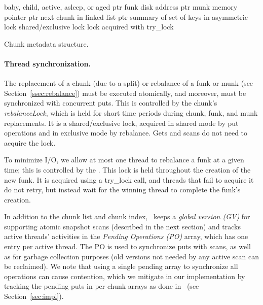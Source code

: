 \begin{algorithm}[htb]

\begin{algorithmic}
\State {} \Comment  baby, child, active, asleep, or aged
\State ptr  \Comment funk disk address
\State ptr  \Comment munk memory pointer
\State ptr  \Comment next chunk in linked list
\State ptr  \Comment summary of set of keys in 
\State asymmetric lock  \Comment shared/exclusive lock 
\State lock  \Comment acquired with try\_lock 
\end{algorithmic}

\caption{Chunk metadata structure.}
\label{alg:chunk}
\end{algorithm}


\paragraph{Thread synchronization.}

The replacement of a chunk (due to a split) or rebalance of a funk or munk (see Section~\ref{ssec:rebalance}) %
must be executed atomically, and moreover, must be synchronized with concurrent puts. 
This is controlled by the chunk's \emph{rebalanceLock}, which is held for short time periods
during chunk, funk, and munk replacements.  It is a shared/exclusive lock, acquired in shared mode 
by put operations and in exclusive mode by rebalance. Gets and scans do not need to acquire the lock.

To minimize I/O, we allow at most one thread to rebalance a funk at a given time; this is controlled by 
the  . 
This lock is held throughout the creation of the new funk. 
It is acquired using a try\_lock call, and threads that fail to acquire it do not retry, but instead wait for the winning thread to complete the funk's creation.

In addition to the chunk list and chunk index, \sys\ keeps a \emph{global version (GV)} for supporting atomic snapshot scans (described in the next section) and tracks active threads' activities in the 
\emph{Pending Operations (PO)} array, which has one entry per active thread. 
The PO is used to synchronize puts with scans, as well as for  garbage collection purposes (old 
versions not needed by any active scan can be reclaimed).
We note that using a single pending array to synchronize all operations can cause contention, which we
mitigate in our implementation by tracking the pending puts in per-chunk arrays as done in~\cite{kiwi} (see Section~\ref{sec:impl}). 

